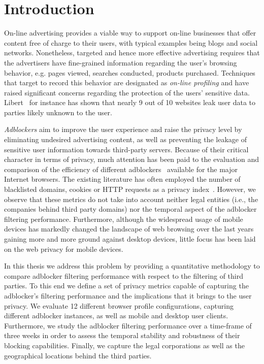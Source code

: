 \chapter{Introduction}
\label{sec:introduction}
On-line advertising provides a viable way to support on-line businesses that offer content free of charge to their users, with typical examples being blogs and social networks. Nonetheless, targeted and hence more effective advertising requires that the advertisers have fine-grained information regarding the user's browsing behavior, e.g. pages viewed, searches conducted, products purchased. Techniques that target to record this behavior are designated as \textit{on-line profiling} and have raised significant concerns regarding the protection of the users' sensitive data. Libert~\cite{libert2015exposing} for instance has shown that nearly 9 out of 10 websites leak user data to parties likely unknown to the user.

\emph{Adblockers} aim to improve the user experience and raise the privacy level by eliminating undesired advertising content, as well as preventing the leakage of sensitive user information towards third-party servers. Because of their critical character in terms of privacy, much attention has been paid to the evaluation and comparison of the efficiency of different adblockers~\cite{pujol, ruffel2015, mayer, englehardt} available for the major Internet browsers. The existing literature has often employed the number of blacklisted domains, cookies or HTTP requests as a privacy index~\cite{butkiewicz, pujol, kontaxis}. However, we observe that these metrics do not take into account neither legal entities (i.e., the companies behind third party domains) nor the temporal aspect of the adblocker filtering performance. Furthermore, although the widespread usage of mobile devices has markedly changed the landscape of web browsing over the last years gaining more and more ground against desktop devices, little focus has been laid on the web privacy for mobile devices.

In this thesis we address this problem by providing a quantitative methodology to compare adblocker filtering performance with respect to the filtering of third parties. To this end we define a set of privacy metrics capable of capturing the adblocker's filtering performance and the implications that it brings to the user privacy. We evaluate 12 different browser profile configurations, capturing different adblocker instances, as well as mobile and desktop user clients. Furthermore, we study the adblocker filtering performance over a time-frame of three weeks in order to assess the temporal stability and robustness of their blocking capabilities. Finally, we capture the legal corporations as well as the geographical locations behind the third parties.


